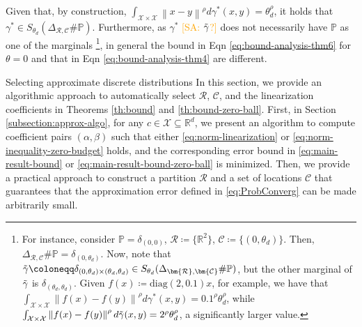 \documentclass[11pt, a4paper, oneside,reqno]{amsart}
\makeatletter
\def\section{\@startsection{section}{1}%
	\z@{.7\linespacing\@plus\linespacing}{.5\linespacing}%
	{\normalfont\large\bfseries}}
\theoremstyle{plain}
\def\prob{\mathbb{P}}
\newcommand{\norm}[1]{\left\lVert#1\right\rVert}
\def\realNum{{\mathbb{R}}}
\def\sX{{\mathcal{X}}}
\def\bsR{{\bm{\mathcal{R}}}}
\def\bsC{{\bm{\mathcal{C}}}}
\newcommand{\SA}[1]{\textcolor{orange}{[SA: #1]}}
\makeatother
\begin{document}
    Given that, by construction, $\int_{\sX \times \sX} \norm{x-y}^\rho d\gamma^*(x, y) = \theta_d^\rho$, it holds that $\gamma^* \in S_{\theta_d}(\Delta_{\bsR, \bsC}\#\prob)$. Furthermore, as $\gamma^*$ \SA{\(\Tilde{\gamma}\)?} does not necessarily have $\prob$ as one of the marginals \footnote{ For instance, consider $\prob = \delta_{(0,0)}$, $\bsR \coloneqq \{ \realNum^2 \}$, $\bsC \coloneqq \{ (0, \theta_d) \}$. Then, $\Delta_{\bsR, \bsC}\#\prob = \delta_{(0, \theta_d)}$. Now, note that $\Tilde{\gamma} \coloneqq \delta_{(0, \theta_d)\times(\theta_d, \theta_d)} \in S_{\theta_d}(\Delta_{\bsR, \bsC}\#\prob)$, but the other marginal of $\Tilde{\gamma}$ is $\delta_{(\theta_d, \theta_d)}$. Given $f(x) \coloneqq \text{diag}(2, 0.1)x$, for example, we have that $\int_{\sX \times \sX} \norm{f(x)-f(y)}^\rho d\gamma^*(x, y) = 0.1^\rho \theta_d^\rho$, while $\int_{\sX \times \sX} \norm{f(x)-f(y)}^\rho d\Tilde{\gamma}(x, y) = 2^\rho \theta_d^\rho$, a significantly larger value.
    }, in general the bound in Eqn \eqref{eq:bound-analysis-thm6} for $\theta=0$ and that in Eqn \eqref{eq:bound-analysis-thm4} are different.
\fi

\section{Selecting approximate discrete distributions}\label{section:optimize-locs-convergence}
In this section, we provide an algorithmic approach to automatically select $\bsR$, $\bsC$, and the linearization coefficients in Theorems \ref{th:bound} and \ref{th:bound-zero-ball}. 
First, in Section \ref{subsection:approx-algo}, for any $c \in \sX \subseteq \realNum^d$, we present an algorithm to compute coefficient pairs $(\alpha, \beta)$ such that either \eqref{eq:norm-linearization} or \eqref{eq:norm-inequality-zero-budget} holds, and the corresponding error bound in \eqref{eq:main-result-bound} or \eqref{eq:main-result-bound-zero-ball} is minimized.
Then, we provide a practical approach to construct a partition $\bsR$ and a set of locations $\bsC$ that guarantees that the approximation error defined in \eqref{eq:ProbConverg} can be made arbitrarily small.
\end{document}
